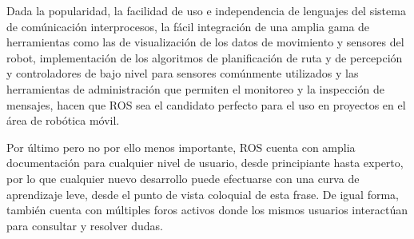 Dada la popularidad, la facilidad de uso e independencia de lenguajes del sistema de comúnicación interprocesos, la fácil integración de una amplia gama de herramientas como las de visualización de los datos de movimiento y sensores del robot, implementación de los algoritmos de planificación de ruta y de percepción y controladores de bajo nivel para sensores comúnmente utilizados y las herramientas de administración que permiten el monitoreo y la inspección de mensajes, hacen que ROS sea el candidato perfecto para el uso en proyectos en el área de robótica móvil.

Por último pero no por ello menos importante, ROS cuenta con amplia documentación \cite{answersros} para cualquier nivel de usuario, desde principiante hasta experto, por lo que cualquier nuevo desarrollo puede efectuarse con una curva de aprendizaje leve, desde el punto de vista coloquial de esta frase. De igual forma, también cuenta con múltiples foros activos donde los mismos usuarios interactúan para consultar y resolver dudas.
